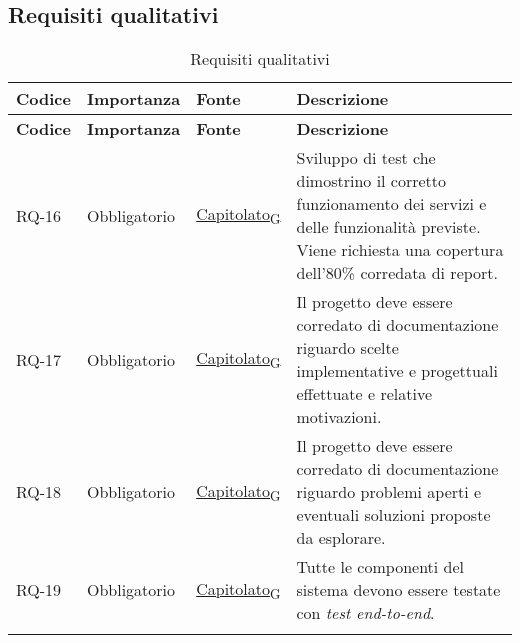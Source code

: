 \subsection{Requisiti qualitativi}
\begin{longtable}{|>{\centering\arraybackslash}m{}|>{\centering\arraybackslash}m{}|>{\centering\arraybackslash}m{}|>{\centering\arraybackslash}m{}|}
	\hline
	\textbf{Codice} & \textbf{Importanza} & \textbf{Fonte} & \textbf{Descrizione}                                                                                                                                              \\\hline
	\endfirsthead
	\textbf{Codice} & \textbf{Importanza} & \textbf{Fonte} & \textbf{Descrizione}                                                                                                                                              \\\hline
	\endhead
	RQ-16           & Obbligatorio        & \href{https://7last.github.io/docs/rtb/documentazione-interna/glossario\#capitolato}{Capitolato\textsubscript{G}}     & Sviluppo di test che dimostrino il corretto funzionamento dei servizi e delle funzionalità previste. Viene richiesta una copertura dell'80\% corredata di report. \\\hline
	RQ-17           & Obbligatorio        & \href{https://7last.github.io/docs/rtb/documentazione-interna/glossario\#capitolato}{Capitolato\textsubscript{G}}     & Il progetto deve essere corredato di documentazione riguardo scelte implementative e progettuali effettuate e relative motivazioni.                               \\\hline
	RQ-18           & Obbligatorio        & \href{https://7last.github.io/docs/rtb/documentazione-interna/glossario\#capitolato}{Capitolato\textsubscript{G}}     & Il progetto deve essere corredato di documentazione riguardo problemi aperti e eventuali soluzioni proposte da esplorare.                                         \\\hline
	RQ-19           & Obbligatorio        & \href{https://7last.github.io/docs/rtb/documentazione-interna/glossario\#capitolato}{Capitolato\textsubscript{G}}     & Tutte le componenti del sistema devono essere testate con \textit{test end-to-end}.                                                                               \\\hline
	\caption{Requisiti qualitativi}
	\label{table:2}
\end{longtable}

